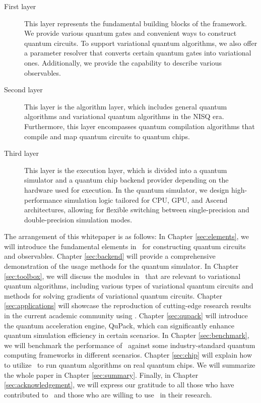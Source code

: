 \begin{description}
    \item[First layer] This layer represents the fundamental building blocks of the framework. We provide various quantum gates and convenient ways to construct quantum circuits. To support variational quantum algorithms, we also offer a parameter resolver that converts certain quantum gates into variational ones. Additionally, we provide the capability to describe various observables.
    \item[Second layer] This layer is the algorithm layer, which includes general quantum algorithms and variational quantum algorithms in the NISQ era. Furthermore, this layer encompasses quantum compilation algorithms that compile and map quantum circuits to quantum chips.
    \item[Third layer] This layer is the execution layer, which is divided into a quantum simulator and a quantum chip backend provider depending on the hardware used for execution. In the quantum simulator, we design high-performance simulation logic tailored for CPU, GPU, and Ascend architectures, allowing for flexible switching between single-precision and double-precision simulation modes.
\end{description}

The arrangement of this whitepaper is as follows: In Chapter \hyperref[sec:elements]{\ref*{sec:elements}}, we will introduce the fundamental elements in \MindQuantum\ for constructing quantum circuits and observables. Chapter \hyperref[sec:backend]{\ref*{sec:backend}} will provide a comprehensive demonstration of the usage methods for the quantum simulator. In Chapter \hyperref[sec:toolbox]{\ref*{sec:toolbox}}, we will discuss the modules in \MindQuantum\ that are relevant to variational quantum algorithms, including various types of variational quantum circuits and methods for solving gradients of variational quantum circuits. Chapter \hyperref[sec:applications]{\ref*{sec:applications}} will showcase the reproduction of cutting-edge research results in the current academic community using \MindQuantum. Chapter \hyperref[sec:qupack]{\ref*{sec:qupack}} will introduce the quantum acceleration engine, QuPack, which can significantly enhance quantum simulation efficiency in certain scenarios. In Chapter \hyperref[sec:benchmark]{\ref*{sec:benchmark}}, we will benchmark the performance of \MindQuantum\ against some industry-standard quantum computing frameworks in different scenarios. Chapter \hyperref[sec:chip]{\ref*{sec:chip}} will explain how to utilize \MindQuantum\ to run quantum algorithms on real quantum chips. We will summarize the whole paper in Chapter \hyperref[sec:summary]{\ref*{sec:summary}}. Finally, in Chapter \hyperref[sec:acknowledgement]{\ref*{sec:acknowledgement}}, we will express our gratitude to all those who have contributed to \MindQuantum\ and those who are willing to use \MindQuantum\ in their research.
